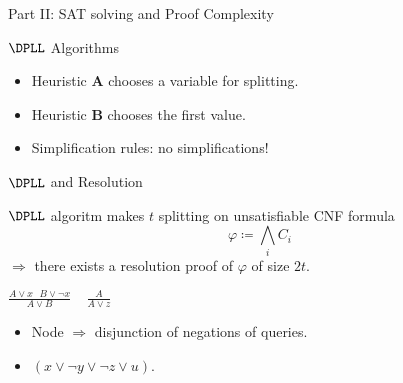 \begin{frame}

    \begin{center}
        \Huge Part II: SAT solving and Proof Complexity
    \end{center}
    
\end{frame}

\begin{frame}{$\DPLL$ Algorithms}

    \begin{center}
                
    \end{center}

    
	\pause
    \pause
    \pause
    \pause
    \pause
    \begin{itemize}
        \item Heuristic $\mathbf{A}$ chooses a variable for splitting.
    	\pause
	    \item Heuristic $\mathbf{B}$ chooses the first value.
    	\pause
    	\item Simplification rules: \alert{no simplifications!}
    \end{itemize}
\end{frame}

\begin{frame}{$\DPLL$ and Resolution}
    
    \begin{theorem}
        $\DPLL$ algoritm makes $t$ splitting on \alert{unsatisfiable} CNF formula
        $$\varphi \coloneqq \bigwedge\limits_i C_i$$
        $\Rightarrow$ there exists a resolution proof of $\varphi$ of size $2t$.
    \end{theorem}

    \pause

    \begin{minipage}{0.58\linewidth}
        \centering
        
    \end{minipage}
    \pause
    \begin{minipage}{0.4\linewidth}
        \centering
        $\frac{A \lor x ~~~ B \lor \neg x}{A \lor B} ~~~~~ \frac{A}{A \lor z}$
        \begin{itemize}
            \item Node $\Rightarrow$ disjunction of negations of queries.
            \item $(x \lor \neg y \lor \neg z \lor u)$.
        \end{itemize}
    \end{minipage}

\end{frame}

